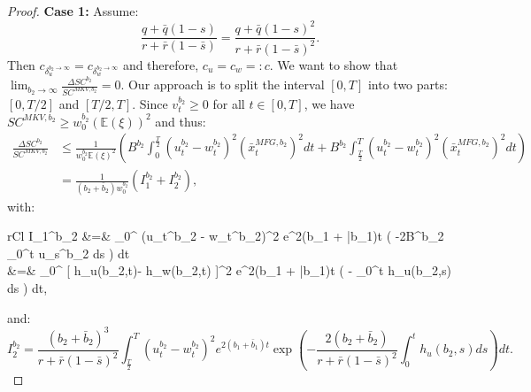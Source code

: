 \documentclass[11pt]{article}
\begin{document}
\begin{proof}
	\textbf{Case 1:} Assume:
	\begin{equation*}
	\frac{q+\bar{q}(1-s)}{r+\bar{r}(1-\bar{s})}=\frac{q+\bar{q}(1-s)^2}{r+\bar{r}(1-\bar{s})^2}.
	\end{equation*}
	Then $c_{\delta_u^{b_2 \to \infty}}=c_{\delta_w^{b_2 \to \infty}}$ and therefore, $c_u = c_w =: c$. 
	We want to show that $\lim_{b_2 \to \infty} \frac{\Delta SC^{b_2}}{SC^{MKV,b_2}} = 0$. Our approach is to split the interval $[0,T]$ into two parts: $[0,T/2]$ and $[T/2,T]$.	
	Since $v^{b_2}_t \geq 0$ for all $t\in [0,T]$, we have $SC^{MKV,b_2} \geq w_0^{b_2} (\mathbb{E}(\xi))^2$ and thus:
	\begin{equation}
	\begin{split}
		\frac{\Delta SC^{b_2}}{SC^{MKV,b_2}} &\leq \frac{1}{w_0^{b_2} \mathbb{E}(\xi)^2 } \left( B^{b_2} \int_{0}^{\frac{T}{2}} (u_t^{b_2} - w_t^{b_2})^2 (\bar{x}_t^{MFG,b_2})^2 dt + B^{b_2} \int_{\frac{T}{2}}^{T} (u_t^{b_2} - w_t^{b_2})^2 (\bar{x}_t^{MFG,b_2})^2 dt \right) \\ 
		&=  \frac{1}{(b_2 + \bar{b}_2) w_0^{b_2} } \left( I_1^{b_2} + I_2^{b_2} \right),
	\end{split}
	\label{eq:I_1_plus_I_2}
	\end{equation}
	with:
	\begin{IEEEeqnarray*}{rCl}
	I_1^{b_2} &=&   \int_0^{} (u_t^{b_2} - w_t^{b_2})^2 e^{2(b_1 + \bar{b}_1)t} \exp \left( -2B^{b_2} \int_0^{t} u_s^{b_2} ds 
	\right) dt \\
	&=&  \int_0^{} [ h_u(b_2,t)- h_w(b_2,t) ]^2 \cdot e^{2(b_1 + \bar{b}_1)t} \exp \left( -   \int_0^t h_u(b_2,s) ds \right) dt, 
	\end{IEEEeqnarray*}
	and:
	$$
		I_2^{b_2} = \frac{(b_2 + \bar{b}_2)^3}{r + \bar{r}(1-\bar{s})^2}  \int_{\frac{T}{2}}^T (u_t^{b_2} - w_t^{b_2})^2 e^{2(b_1 + \bar{b}_1)t} \exp \left( -\frac{2 (b_2 + \bar{b}_2)}{r + \bar{r}(1-\bar{s})^2} \int_0^{t} h_u(b_2,s) ds \right) dt.
	$$
	

\end{proof}
\end{document}

